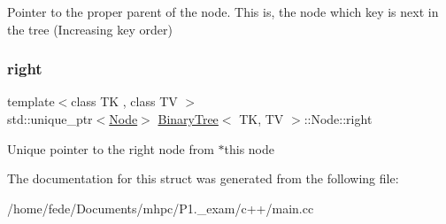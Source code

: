 Pointer to the proper parent of the node. This is, the node which key is next in the tree (Increasing key order) \mbox{\label{structBinaryTree_1_1Node_a098842d35cfa60029b10a7c4306f2ea6}} 
\subsubsection{\texorpdfstring{right}{right}}
{\footnotesize\ttfamily template$<$class TK , class TV $>$ \\
std\+::unique\+\_\+ptr$<$\mbox{\hyperlink{structBinaryTree_1_1Node}{Node}}$>$ \mbox{\hyperlink{classBinaryTree}{Binary\+Tree}}$<$ TK, TV $>$\+::Node\+::right}

Unique pointer to the right node from $\ast$this node 

The documentation for this struct was generated from the following file\+:\begin{DoxyCompactItemize}
\item 
/home/fede/\+Documents/mhpc/\+P1.\+\_\+exam/c++/main.\+cc\end{DoxyCompactItemize}
